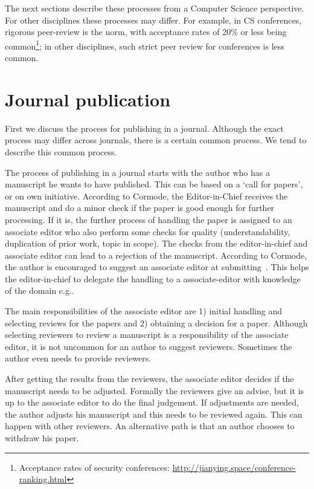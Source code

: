 \documentclass{ou-report}
\newcommand{\outline}[1]{{\color{blue} #1}}
\begin{document}
The next sections describe these processes from a Computer Science perspective. 
For other disciplines these processes may differ. For example, in CS 
conferences, rigorous peer-review is the norm, with acceptance rates of 20\% or 
less being common\footnote{Acceptance rates of security conferences: \url{http://jianying.space/conference-ranking.html}}; in other disciplines, such strict peer review for conferences is
less common.
    


\section{Journal publication}

First we discuss the process for publishing in a journal. Although the 
exact process may differ across journals, there is a certain common process. We 
tend to describe this common process.

The process of publishing in a journal starts with the author who has a manuscript 
he wants to have published. This can be based on a `call for papers', or on own 
initiative. According to Cormode, the Editor-in-Chief receives the manuscript 
and do a minor check if the paper is good enough for further processing. If it 
is, the further process of handling the paper is assigned to an associate editor 
who also perform some checks for quality (understandability, duplication of 
prior work, topic in scope). The checks from the editor-in-chief and associate 
editor can lead to a rejection of the manuscript. According to Cormode, the 
author is encouraged to suggest an associate editor at submitting~\cite{C2013}.
This helps the editor-in-chief to delegate the handling to a associate-editor with knowledge of the domain e.g..

The main responsibilities of the associate editor are 1) initial handling and 
selecting reviews for the papers and 2) obtaining a decision for a paper. 
Although selecting reviewers to review a manuscript is a responsibility of the 
associate editor, it is not uncommon for an author to suggest reviewers. 
Sometimes the author even needs to provide reviewers.

After getting the results from the reviewers, the associate editor decides if 
the manuscript needs to be adjusted. Formally the reviewers give an advise, but 
it is up to the associate editor to do the final judgement. If adjustments are 
needed, the author adjusts his manuscript and this needs to be reviewed again. 
This can happen with other reviewers. An alternative path is that an author 
chooses to withdraw his paper.
\end{document}

